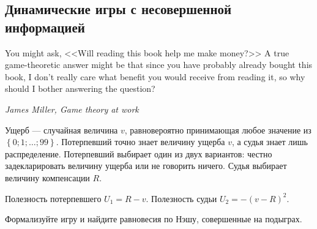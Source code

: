 \subsection{Динамические игры с несовершенной информацией}
%
\begin{rem}
You might ask, <<Will reading this book help me make money?>> A true game-theoretic answer might be that since you have probably already bought this book, I don't really care what benefit you would receive from reading it, so why should I bother answering the question?

{\it James Miller, Game theory at work \cite{miller:gtw}}
\end{rem}


\begin{problem}
Ущерб --- случайная величина  $v$, равновероятно принимающая любое значение из  $\left\{0;1;\ldots ;99\right\}$. Потерпевший точно знает величину ущерба  $v$, а судья знает лишь распределение. Потерпевший выбирает один из двух вариантов: честно задекларировать величину ущерба или не говорить ничего. Судья выбирает величину компенсации  $R$.\par
Полезность потерпевшего  $U_{1} =R-v$. Полезность судьи  $U_{2} =-\left(v-R\right)^{2} $.\par
Формализуйте игру и найдите равновесия по Нэшу, совершенные на подыграх.



\begin{sol}

\end{sol}
\end{problem}



